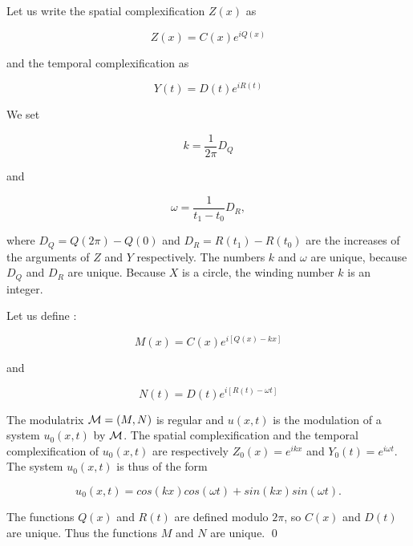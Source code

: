 \begin{pf}
Let us write the spatial complexification $Z(x)$ as

\begin{equation}
Z(x)=C(x) e^{iQ(x)} 
\end{equation}

and the temporal complexification as 

\begin{equation}
Y(t)=D(t)e^{iR(t)} 
\end{equation}

We set 

\begin{equation}
k=\frac{1}{2\pi}D_Q
\end{equation}

and

\begin{equation}
\omega=\frac{1}{t_1-t_0}D_R,
\end{equation}

where $D_Q=Q(2\pi)-Q(0)$ and $D_R=R(t_1)-R(t_0)$ are the increases
 of the arguments of $Z$ and $Y$ respectively. 
The numbers $k$ and $\omega$ are unique,
because $D_Q$ and $D_R$ are unique.
Because $X$ is a circle, the winding number $k$ is an integer.

\medskip

Let us define :

\begin{equation}
M(x)=C(x)e^{i[Q(x)-kx]}
\end{equation}

and 

\begin{equation}
N(t)=D(t)e^{i[R(t)-\omega t]}
\end{equation}

The modulatrix ${\cal M}=(M,N)$ is regular and $u(x,t)$ is the
 modulation of a system $u_0(x,t)$ by ${\cal M}$.
 The spatial complexification and the temporal complexification
 of $u_0(x,t)$ are respectively $Z_0(x)=e^{ikx}$ and 
$Y_0(t)=e^{i\omega t}$. The system $u_0(x,t)$ is thus of the form

\begin{equation}
u_0(x,t)=cos(kx)cos(\omega t)+sin(kx)sin(\omega t).
\end{equation}

The functions $Q(x)$ and $R(t)$ are defined modulo $2\pi$, so $C(x)$
 and $D(t)$ are unique. 
Thus the functions $M$ and $N$ are unique.
\qed\end{pf}

